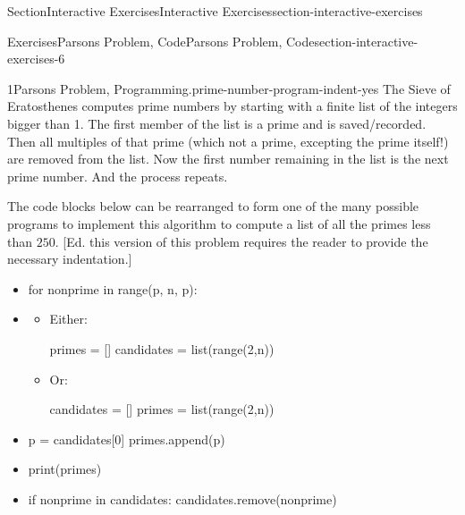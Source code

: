 \documentclass[twoside,10pt,]{article}
\numberwithin{equation}{section}
\begin{document}
\begin{sectionptx}{Section}{Interactive Exercises}{}{Interactive Exercises}{}{}{section-interactive-exercises}
\begin{exercises-subsection}{Exercises}{Parsons Problem, Code}{}{Parsons Problem, Code}{}{}{section-interactive-exercises-6}
\begin{introduction}{}
\end{introduction}%
\begin{divisionexercise}{1}{Parsons Problem, Programming.}{}{prime-number-program-indent-yes}%
%
%
The Sieve of Eratosthenes computes prime numbers by starting with a finite list of the integers bigger than 1.  The first member of the list is a prime and is saved\slash{}recorded.  Then all multiples of that prime (which not a prime, excepting the prime itself!) are removed from the list.  Now the first number remaining in the list is the next prime number.  And the process repeats.%
\par
The code blocks below can be rearranged to form one of the many possible programs to implement this algorithm to compute a list of all the primes less than \(250\). [Ed. this version of this problem requires the reader to provide the necessary indentation.]%
\par
%
\begin{itemize}[label=\textbullet]
\item{}%
\begin{codedisplayleft}
for nonprime in range(p, n, p):
\end{codedisplayleft}
%
\item{}%
\begin{itemize}[label=]
\item{}Either:%
\par
%
\begin{codedisplay}
primes = []
candidates = list(range(2,n))
\end{codedisplay}
%
\item{}Or:%
\par
%
\begin{codedisplay}
candidates = []
primes = list(range(2,n))
\end{codedisplay}
%
\end{itemize}
%
\item{}%
\begin{codedisplayleft}
p = candidates[0]
primes.append(p)
\end{codedisplayleft}
%
\item{}%
\begin{codedisplayleft}
print(primes)
\end{codedisplayleft}
%
\item{}%
\begin{codedisplayleft}
if nonprime in candidates:
    candidates.remove(nonprime)
\end{codedisplayleft}

\end{itemize}
\end{divisionexercise}
\end{exercises-subsection}
\end{sectionptx}
\end{document}
